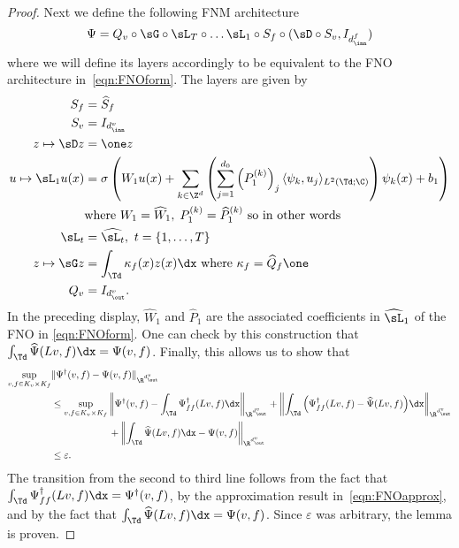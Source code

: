 \documentclass[letterpaper,11pt]{article}
\begin{document}
\begin{proof}
    Next we define the following FNM architecture
    \begin{equation}
        \Psi = Q_v \circ \sG \circ \sL_T \circ \dots \sL_1 \circ S_f \circ (\sD\circ S_v, I_{d_{\inn}^f})
    \end{equation}
    where we will define its layers accordingly to be equivalent to the FNO architecture in~\eqref{eqn:FNOform}. The layers are given by 
    \begin{align*}
        S_f & = \widehat{S}_f\\
        S_v & = I_{d_{\inn}^{v}}\\
        z\mapsto \sD z&= \one z \\
        u\mapsto \sL_1 u(x) & = \sigma\left(W_1u(x) + \sum_{k \in \Z^d}\left(\sum_{j=1}^{d_0}\left(P_1^{(k)}\right)_j \langle \psi_k, u_j \rangle_{L^2(\Td;\C)}\right)\psi_k(x) + b_1\right)\\
        & \text{where } W_1 = \widehat{W}_1, \; P^{(k)}_1 = \widehat{P}^{(k)}_1 \text{ so in other words }\\
        \sL_t & = \widehat{\sL_t}, \ t = \{1, \dots, T\}\\
        z\mapsto \sG z& = \int_{\Td}\kappa_f(x) z(x) \dx \text{ where } \kappa_f = \widehat{Q}_f\one \\
        Q_v & = I_{d_{\out}^{v}}.
    \end{align*}
In the preceding display, $\widehat{W}_1$ and $\widehat{P}_1$ are the associated coefficients in $\widehat{\sL}_1$ of the FNO in \eqref{eqn:FNOform}. One can check by this construction that $\int_{\Td}\widehat{\Psi}(Lv,f) \dx = \Psi(v,f)$. Finally, this allows us to show that
\begin{align*}
    \sup_{v,f \in K_v \times K_f}&\|\Psi^\dagger(v,f) - \Psi(v,f)\|_{\R^{d_{\out}^{v}}} \\ &\leq \sup_{v,f \in K_v \times K_f} \left\|\Psi^\dagger(v,f) - \int_{\Td} \Psi^\dagger_{ff}(Lv,f)\dx\right\|_{\R^{d_{\out}^{v}}} + \left\| \int_{\Td}\Big(\Psi^\dagger_{ff}(Lv,f) - \widehat{\Psi}(Lv,f)\Big)\dx\right\|_{\R^{d_{\out}^{v}}}\\
    &\qquad\qquad\qquad+ \left\| \int_{\Td}\widehat{\Psi}(Lv,f) \dx - \Psi(v,f) \right\|_{\R^{d_{\out}^{v}}}\\
    & \leq \varepsilon.
\end{align*}
The transition from the second to third line follows from the fact that $\int_{\Td} \Psi^\dagger_{ff}(Lv,f)\dx = \Psi^\dagger(v,f)$, by the approximation result in~\eqref{eqn:FNOapprox}, and by the fact that $\int_{\Td}\widehat{\Psi}(Lv,f) \dx = \Psi(v,f)$. Since $\varepsilon$ was arbitrary, the lemma is proven. 
\end{proof}
\end{document}

